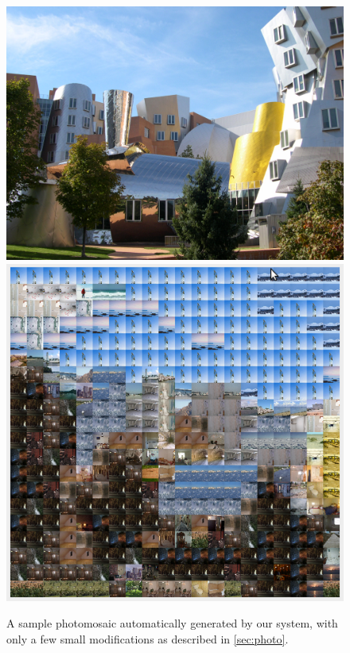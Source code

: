  \begin{figure}
\hspace{-8mm}
\includegraphics[width=1\linewidth]{Figures/stata1.jpg}
\includegraphics[width=1\linewidth]{Figures/reconstruction.png}
\caption{A sample photomosaic automatically generated by our system, with only a few small modifications as described in \ref{sec:photo}.}
\label{fig:stata}
\end{figure}
